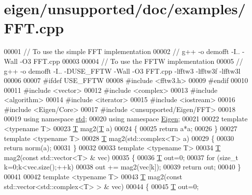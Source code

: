 \hypertarget{eigen_2unsupported_2doc_2examples_2_f_f_t_8cpp_source}{}\section{eigen/unsupported/doc/examples/\+F\+FT.cpp}
\label{eigen_2unsupported_2doc_2examples_2_f_f_t_8cpp_source}

\begin{DoxyCode}
00001 \textcolor{comment}{//  To use the simple FFT implementation}
00002 \textcolor{comment}{//  g++ -o demofft -I.. -Wall -O3 FFT.cpp }
00003 
00004 \textcolor{comment}{//  To use the FFTW implementation}
00005 \textcolor{comment}{//  g++ -o demofft -I.. -DUSE\_FFTW -Wall -O3 FFT.cpp -lfftw3 -lfftw3f -lfftw3l}
00006 
00007 \textcolor{preprocessor}{#ifdef USE\_FFTW}
00008 \textcolor{preprocessor}{#include <fftw3.h>}
00009 \textcolor{preprocessor}{#endif}
00010 
00011 \textcolor{preprocessor}{#include <vector>}
00012 \textcolor{preprocessor}{#include <complex>}
00013 \textcolor{preprocessor}{#include <algorithm>}
00014 \textcolor{preprocessor}{#include <iterator>}
00015 \textcolor{preprocessor}{#include <iostream>}
00016 \textcolor{preprocessor}{#include <Eigen/Core>}
00017 \textcolor{preprocessor}{#include <unsupported/Eigen/FFT>}
00018 
00019 \textcolor{keyword}{using namespace }\hyperlink{namespacestd}{std};
00020 \textcolor{keyword}{using namespace }\hyperlink{namespace_eigen}{Eigen};
00021 
00022 \textcolor{keyword}{template} <\textcolor{keyword}{typename} T>
00023 \hyperlink{group___sparse_core___module}{T} mag2(\hyperlink{group___sparse_core___module}{T} a)
00024 \{
00025     \textcolor{keywordflow}{return} a*a;
00026 \}
00027 \textcolor{keyword}{template} <\textcolor{keyword}{typename} T>
00028 \hyperlink{group___sparse_core___module}{T} mag2(std::complex<T> a)
00029 \{
00030     \textcolor{keywordflow}{return} norm(a);
00031 \}
00032 
00033 \textcolor{keyword}{template} <\textcolor{keyword}{typename} T>
00034 \hyperlink{group___sparse_core___module}{T} mag2(\textcolor{keyword}{const} std::vector<T> & vec)
00035 \{
00036     \hyperlink{group___sparse_core___module}{T} out=0;
00037     \textcolor{keywordflow}{for} (\textcolor{keywordtype}{size\_t} k=0;k<vec.size();++k)
00038         out += mag2(vec[k]);
00039     \textcolor{keywordflow}{return} out;
00040 \}
00041 
00042 \textcolor{keyword}{template} <\textcolor{keyword}{typename} T>
00043 \hyperlink{group___sparse_core___module}{T} mag2(\textcolor{keyword}{const} std::vector<std::complex<T> > & vec)
00044 \{
00045     \hyperlink{group___sparse_core___module}{T} out=0;

\end{DoxyCode}
